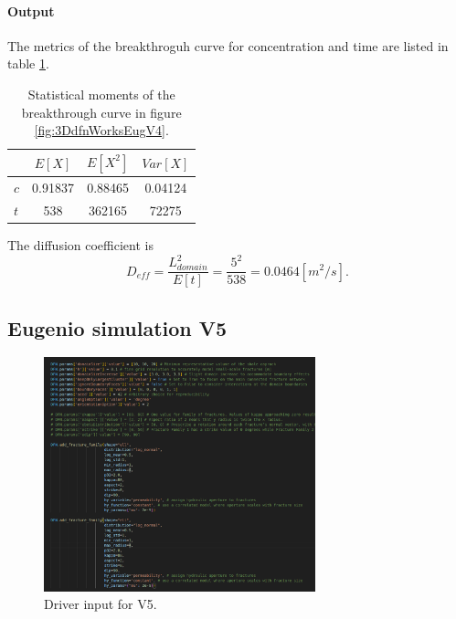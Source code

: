 \documentclass{article}
\begin{document}
\FloatBarrier
\paragraph{Output} The metrics of the breakthroguh curve for concentration and time are listed in table \ref{tab:StatMomV4}.
\begin{table}[h!]
\centering
\begin{tabular}{lccc}
\toprule
        & $ E[X]$ & $E[X^2]$ & $Var[X]$ \\
\midrule
$c$     & 0.91837        & 0.88465           & 0.04124           \\
$t$     & 538            & 362165            & 72275             \\
\bottomrule
\end{tabular}
\caption{Statistical moments of the breakthrough curve in figure \ref{fig:3DdfnWorksEugV4}.}
\label{tab:StatMomV4}
\end{table}
The diffusion coefficient is
\[ D_{eff} = \frac{L_{domain}^2}{E[t]} = \frac{5^2}{538} = 0.0464 [m^2/s]. \]

\FloatBarrier  %
\subsection{Eugenio simulation V5}
\begin{figure}[htbp]
    \centering
    \includegraphics[width=0.7\textwidth]{images/dfnWorksImages/dfnDiffEugDriverV5.png}
    \caption{Driver input for V5.}
    \label{fig:InputV5}
\end{figure}
\end{document}
